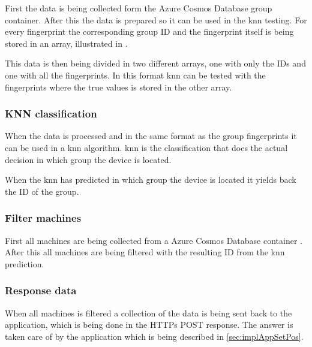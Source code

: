 \bigskip

First the data is being collected form the Azure Cosmos Database \cite{IntroductionAzureCosmos} group container. 
After this the data is prepared so it can be used in the \acrshort{knn} testing.
For every fingerprint the corresponding group ID and the fingerprint itself is being stored in an array, illustrated in .


This data is then being divided in two different arrays, one with only the IDs and one with all the fingerprints.
In this format \acrshort{knn} can be tested with the fingerprints where the true values is stored in the other array.


\subsubsection{KNN classification}\label{sec:implServerSetPosKnnClassification}
When the data is processed and in the same format as the group fingerprints it can be used in a \acrshort{knn} algorithm.
\acrshort{knn} is the classification that does the actual decision in which group the device is located.

\bigskip

When the \acrshort{knn} has predicted in which group the device is located it yields back the ID of the group. 

\subsubsection{Filter machines}\label{sec:implServerSetPosFilterMachines}
First all machines are being collected from a Azure Cosmos Database container \cite{IntroductionAzureCosmos}.
After this all machines are being filtered with the resulting ID from the \acrshort{knn} prediction.

\subsubsection{Response data}\label{sec:implServerSetPosResponse}
When all machines is filtered a collection of the data is being sent back to the application, which is being done in the HTTPs POST response.
The answer is taken care of by the application which is being described in \cref{sec:implAppSetPos}.


